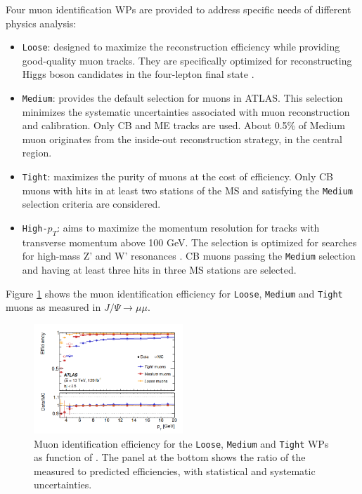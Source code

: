 Four muon identification WPs are provided to address specific needs of different physics analysis:
\begin{itemize}
    \item \texttt{Loose}: designed to maximize the reconstruction efficiency while providing good-quality muon tracks. They are specifically optimized for reconstructing Higgs boson candidates in the four-lepton final state \cite{Higgs_4leptons}.
    \item \texttt{Medium}: provides the default selection for muons in ATLAS. This selection minimizes the systematic uncertainties associated with muon reconstruction and calibration. Only CB and ME tracks are used. About 0.5\% of Medium muon originates from the inside-out reconstruction strategy, in the central region. 
    \item \texttt{Tight}: maximizes the purity of muons at the cost of efficiency. Only CB muons with hits in at least two stations of the MS and satisfying the \texttt{Medium} selection criteria are considered.
    \item \texttt{High-$p_T$}: aims to maximize the momentum resolution for tracks with transverse momentum above 100 GeV. The selection is optimized for searches for high-mass Z' and W' resonances \cite{W,dilepton}. CB muons passing the \texttt{Medium} selection and having at least three hits in three MS stations are selected.
\end{itemize}
Figure \ref{fig:chap2:Objects:Muon:ID:Eff} shows the muon identification efficiency for \texttt{Loose}, \texttt{Medium} and \texttt{Tight} muons as measured in $J/\Psi\rightarrow\mu\mu$. 
\begin{figure}[htbp]
    \centering
    \includegraphics[width=0.5\textwidth]{Ch2/Img/Muon_ID_Eff.png}
    \caption{Muon identification efficiency for the \texttt{Loose}, \texttt{Medium} and \texttt{Tight} WPs as function of \pT. The panel at the bottom shows the ratio of the measured to predicted efficiencies, with statistical and systematic uncertainties.}
    \label{fig:chap2:Objects:Muon:ID:Eff}
\end{figure}

